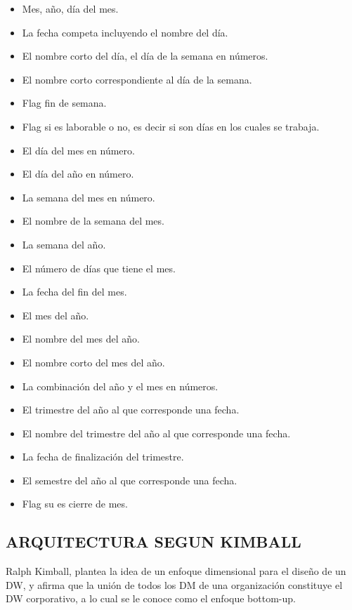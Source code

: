 \documentclass[%
 reprint,
 amsmath,amssymb,
 aps,
]{revtex4-1}
\begin{document}
\begin{itemize}
    \begin{itemize}
	\item Mes, año, día del mes.
	\item La fecha competa incluyendo el nombre del día.
	\item El nombre corto del día, el día de la semana en números.
	\item El nombre corto correspondiente al día de la semana.
	\item Flag fin de semana.
	\item Flag si es laborable o no, es decir si son días en los cuales se trabaja.
	\item El día del mes en número.
	\item El día del año en número.
	\item La semana del mes en número.
	\item El nombre de la semana del mes.
	\item La semana del año.
	\item El número de días que tiene el mes.
	\item La fecha del fin del mes.
	\item El mes del año.
	\item El nombre del mes del año.
	\item El nombre corto del mes del año.
	\item La combinación del año y el mes en números.
	\item El trimestre del año al que corresponde una fecha.
	\item El nombre del trimestre del año al que corresponde una fecha.
	\item La fecha de finalización del trimestre.
	\item El semestre del año al que corresponde una fecha.
	\item Flag su es cierre de mes.
    \end{itemize}
\end{itemize}

\subsection{ARQUITECTURA SEGUN KIMBALL}

Ralph Kimball, plantea la idea de un enfoque dimensional para el diseño de un DW, y afirma que la unión de todos los DM de una organización constituye el DW corporativo, a lo cual se le conoce como el enfoque bottom-up.\\
\end{document}
